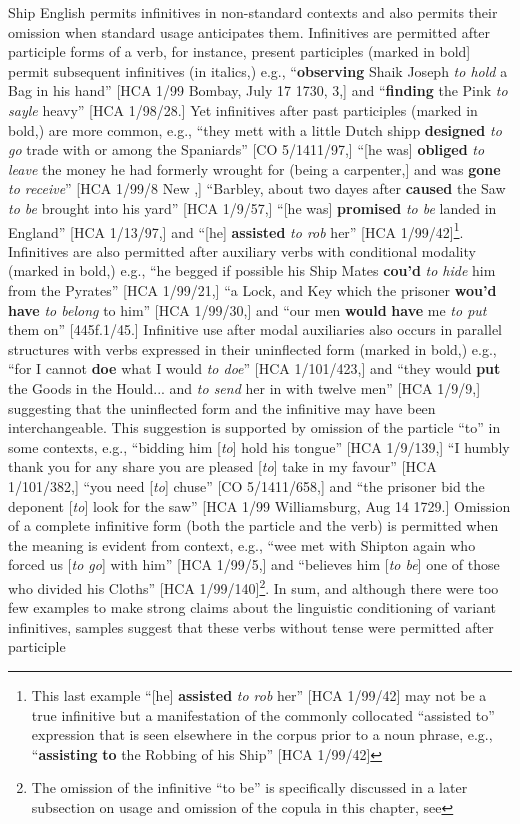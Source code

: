 Ship English permits infinitives in non-standard contexts and also permits their omission when standard usage anticipates them. Infinitives are permitted after participle forms of a verb, for instance, present participles (marked in bold] permit subsequent infinitives (in italics,) e.g., “\textbf{observing} Shaik Joseph \textit{to hold} a Bag in his hand” [HCA 1/99 Bombay, July 17 1730, 3,] and “\textbf{finding} the Pink \textit{to sayle} heavy” [HCA 1/98/28.] Yet infinitives after past participles (marked in bold,) are more common, e.g., “they mett with a little Dutch shipp \textbf{designed} \textit{to go} trade with or among the Spaniards” [CO 5/1411/97,] “[he was] \textbf{obliged} \textit{to leave} the money he had formerly wrought for (being a carpenter,] and was \textbf{gone} \textit{to receive}” [HCA 1/99/8 New \citealt{Providence1722},] “Barbley, about two dayes after \textbf{caused} the Saw \textit{to be} brought into his yard” [HCA 1/9/57,] “[he was] \textbf{promised} \textit{to be} landed in England” [HCA 1/13/97,] and “[he] \textbf{assisted} \textit{to rob} her” [HCA 1/99/42]\footnote{This last example “[he] \textbf{assisted} \textit{to rob} her” [HCA 1/99/42] may not be a true infinitive but a manifestation of the commonly collocated “assisted to” expression that is seen elsewhere in the corpus prior to a noun phrase, e.g., “\textbf{assisting} \textbf{to} the Robbing of his Ship” [HCA 1/99/42]}. Infinitives are also permitted after auxiliary verbs with conditional modality (marked in bold,) e.g., “he begged if possible his Ship Mates \textbf{cou’d} \textit{to hide} him from the Pyrates” [HCA 1/99/21,] “a Lock, and Key which the prisoner \textbf{wou’d} \textbf{have} \textit{to belong} to him” [HCA 1/99/30,] and “our men \textbf{would} \textbf{have} me \textit{to put} them on” [445f.1/45.] Infinitive use after modal auxiliaries also occurs in parallel structures with verbs expressed in their uninflected form (marked in bold,) e.g., “for I cannot \textbf{doe} what I would \textit{to doe}” [HCA 1/101/423,] and “they would \textbf{put} the Goods in the Hould... and \textit{to send} her in with twelve men” [HCA 1/9/9,] suggesting that the uninflected form and the infinitive may have been interchangeable. This suggestion is supported by omission of the particle “to” in some contexts, e.g., “bidding him [\textit{to}] hold his tongue” [HCA 1/9/139,] “I humbly thank you for any share you are pleased [\textit{to}] take in my favour” [HCA 1/101/382,] “you need [\textit{to}] chuse” [CO 5/1411/658,] and “the prisoner bid the deponent [\textit{to}] look for the saw” [HCA 1/99 Williamsburg, Aug 14 1729.] Omission of a complete infinitive form (both the particle and the verb) is permitted when the meaning is evident from context, e.g., “wee met with Shipton again who forced us [\textit{to go}] with him” [HCA 1/99/5,] and “believes him [\textit{to be}] one of those who divided his Cloths” [HCA 1/99/140]\footnote{The omission of the infinitive “to be” is specifically discussed in a later subsection on usage and omission of the copula in this chapter, see }. In sum, and although there were too few examples to make strong claims about the linguistic conditioning of variant infinitives, samples suggest that these verbs without tense were permitted after participle 